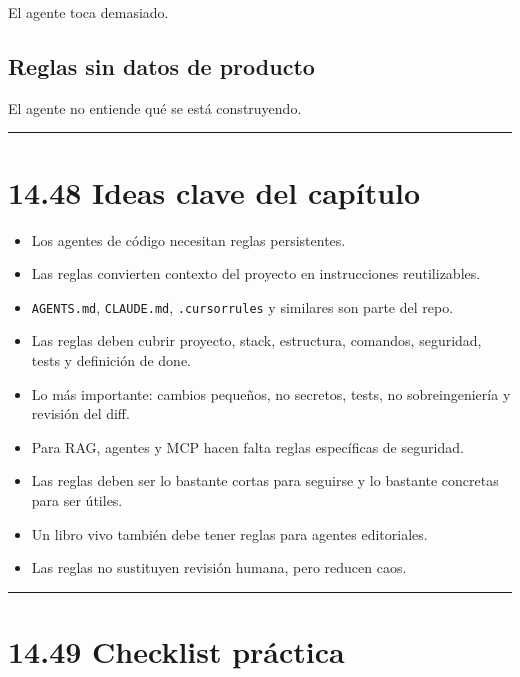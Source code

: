 El agente toca demasiado.

\subsection{Reglas sin datos de
producto}\label{reglas-sin-datos-de-producto}

El agente no entiende qué se está construyendo.

\begin{center}\rule{0.5\linewidth}{0.5pt}\end{center}

\section{14.48 Ideas clave del
capítulo}\label{ideas-clave-del-capuxedtulo-13}

\begin{itemize}
\tightlist
\item
  Los agentes de código necesitan reglas persistentes.
\item
  Las reglas convierten contexto del proyecto en instrucciones
  reutilizables.
\item
  \passthrough{\lstinline!AGENTS.md!},
  \passthrough{\lstinline!CLAUDE.md!},
  \passthrough{\lstinline!.cursorrules!} y similares son parte del repo.
\item
  Las reglas deben cubrir proyecto, stack, estructura, comandos,
  seguridad, tests y definición de done.
\item
  Lo más importante: cambios pequeños, no secretos, tests, no
  sobreingeniería y revisión del diff.
\item
  Para RAG, agentes y MCP hacen falta reglas específicas de seguridad.
\item
  Las reglas deben ser lo bastante cortas para seguirse y lo bastante
  concretas para ser útiles.
\item
  Un libro vivo también debe tener reglas para agentes editoriales.
\item
  Las reglas no sustituyen revisión humana, pero reducen caos.
\end{itemize}

\begin{center}\rule{0.5\linewidth}{0.5pt}\end{center}

\section{14.49 Checklist práctica}\label{checklist-pruxe1ctica-13}

